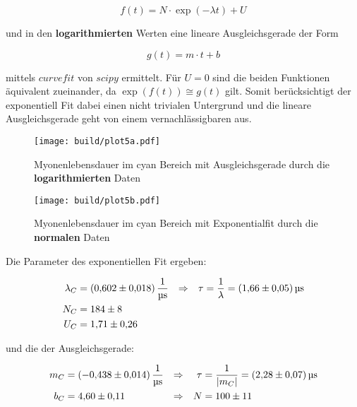 \begin{equation}
	f(t)=N \cdot \exp(-\lambda t) + U
	\label{eqn:exp}
\end{equation}

und in den \textbf{logarithmierten} Werten eine lineare Ausgleichsgerade der Form

\begin{equation}
	g(t)=m \cdot t +b
	\label{eqn:lin}
\end{equation}

mittels $curve fit$ von $scipy$ ermittelt.
Für $U=0$ sind die beiden Funktionen äquivalent zueinander, da $ \exp(f(t)) \cong g(t)$ gilt. 
Somit berücksichtigt der exponentiell Fit dabei einen nicht trivialen Untergrund und die lineare Ausgleichsgerade geht von einem vernachlässigbaren aus.

\begin{figure}[H]
	\centering
	\texttt{[image: build/plot5a.pdf]}
	\caption{Myonenlebensdauer im cyan Bereich mit Ausgleichsgerade durch die \textbf{logarithmierten} Daten}\label{fig:plt5a}
\end{figure}

\begin{figure}[H]
	\centering
	\texttt{[image: build/plot5b.pdf]}
	\caption{Myonenlebensdauer im cyan Bereich mit Exponentialfit durch die \textbf{normalen} Daten}\label{fig:plt5b}
\end{figure}

Die Parameter des exponentiellen Fit ergeben:

\begin{align}
	\lambda_C&=\qty{0.602(0.018)}{\per\us} &\Rightarrow & & \tau&=\frac{1}{\lambda }=\qty{1.66(0.05)}{\us} \\
	N_C&=\num{184(8)} \notag \\
	U_C&=\num{1.71(0.26)} \notag
\end{align}

und die der Ausgleichsgerade: 

\begin{align}
	m_C&=\qty{-0.438(0.014)}{\per\us} &\Rightarrow & & \tau&=\frac{1}{|m_C|}=\qty{2.28(0.07)}{\us} \\
	b_C&=\num{4.60(0.11)} &\Rightarrow & & N&=\num{100(11)} \notag
\end{align}

